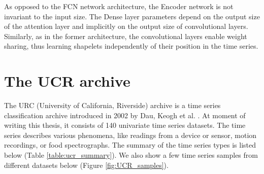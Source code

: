 \documentclass[a4paper,11pt,twoside]{report}
\theoremstyle{definition}
\begin{document}
As opposed to the FCN network architecture, the Encoder network is not invariant to the input size. The Dense layer parameters depend on the output size of the attention layer and implicitly on the output size of convolutional layers.  Similarly, as in the former architecture, the convolutional layers enable weight sharing, thus learning shapelets independently of their position in the time series.


\section{The UCR archive}
The URC (University of California, Riverside) archive is a time series classification archive introduced in 2002 by Dau, Keogh et al. \cite{UCR_archive}. At moment of writing this thesis, it consists of 140 univariate time series datasets. The time series describes various phenomena, like readings from a device or sensor, motion recordings, or food spectrographs. The summary of the time series types is listed below (Table \ref{table:ucr_summary}). We also show a few time series samples from different datasets below (Figure \ref{fig:UCR_samples}).
\begin{table}[!h]
\centering
\tabcolsep=0.11cm
\caption{Summary of types of datasets in the UCR archive.}
\label{table:ucr_summary}
\end{table}
\FloatBarrier
\end{document}
